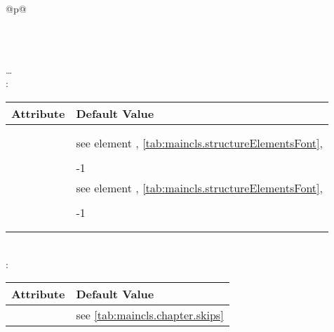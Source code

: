   \begin{longtable}{@{}p{\columnwidth}@{}}
    \caption{Defaults for the headings of  and
      }%
    \label{tab:maincls.section.defaults}\\
    \endfirsthead
    \caption[]{Default for the headings of  and
       \emph{(continued)}}\\
    \addlinespace[-\normalbaselineskip]
    \endhead
    \raggedleft\dots\\
    \endfoot
    \endlastfoot
    : \\*
    \begin{tabularx}{\linewidth}{ll}
    \toprule
    Attribute & Default Value \\
    \midrule
    \PValue{afterskip}   & \PValue{0pt plus 1fil} \\
    \PValue{beforeskip}  & \PValue{0pt plus 1fil + \Length{baselineskip}} \\
    \PValue{font}        & see element \DescRef{maincls.fontelement.part}, 
                           \autoref{tab:maincls.structureElementsFont}, 
                           \autopageref{tab:maincls.structureElementsFont} \\
    \PValue{innerskip}   & \PValue{20pt} \\
    \PValue{level}       & -1 \\
    \PValue{prefixfont}  & see element 
                           \DescRef{maincls.fontelement.partnumber},
                           \autoref{tab:maincls.structureElementsFont}, 
                           \autopageref{tab:maincls.structureElementsFont} \\
    \PValue{tocindent}   & \PValue{0pt} \\
    \PValue{toclevel}    & -1 \\
    \PValue{tocnumwidth} & \PValue{2em} \\
    \PValue{tocstyle}    & \PValue{part} \\
    \bottomrule
    \end{tabularx} \\
    \addlinespace[\normalbaselineskip]
    : \\*
    \begin{tabularx}{\linewidth}{ll}
    \toprule
    Attribute & Default Value \\
    \midrule
    \PValue{afterskip}   & see \autoref{tab:maincls.chapter.skips} \\

\end{tabularx}
\end{longtable}
